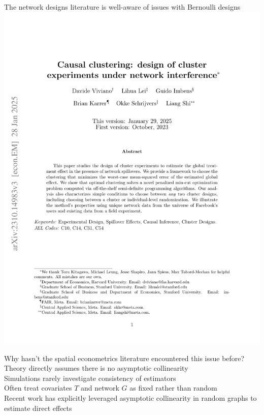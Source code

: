 \documentclass[aspectratio=169]{beamer}
\theoremstyle{remark}
\begin{document}
\begin{frame}{The network designs literature is well-aware of issues with Bernoulli designs}
    \vfill
    \centering
    \includegraphics[height=0.95\textheight, page=1, trim={1.5cm 9cm 0 3.5cm}, clip]{./papers/viviano-clustering.pdf}
\end{frame}


\begin{frame}{Why hasn't the spatial econometrics literature encountered this issue before?}
    Theory directly assumes there is no asymptotic collinearity \\
    \vspace{3mm}
    Simulations rarely investigate consistency of estimators \\
    \vspace{3mm}
    Often treat covariates $T$ and network $G$ as fixed rather than random \\
    \vspace{6mm}
    \footnotesize *Recent work has explicitly leveraged asymptotic collinearity in random graphs to estimate direct effects \citep{li2022f}
\end{frame}
\end{document}
